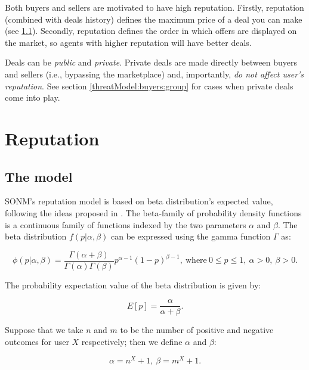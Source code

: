 \documentclass[11pt]{article}
\begin{document}
Both buyers and sellers are motivated to have high reputation. Firstly, reputation (combined with deals history) defines the maximum price of a deal you can make (see \ref{reputation:theModel}). Secondly, reputation defines the order in which offers are displayed on the market, so agents with higher reputation will have better deals.

Deals can be \textit{public} and \textit{private}. Private deals are made directly between buyers and sellers (i.e., bypassing the marketplace) and, importantly, \textit{do not affect user's reputation}. See section \ref{threatModel:buyers:group} for cases when private deals come into play.

\section{Reputation} \label{reputation}

\subsection{The model} \label{reputation:theModel}

SONM's reputation model is based on beta distribution's expected value, following the ideas proposed in \cite{josang2002beta}. The beta-family of probability density functions is a continuous family of functions indexed by the two parameters $ \alpha $ and $ \beta $. The beta distribution $ f(p | \alpha, \beta) $ can be expressed using the gamma function $ \Gamma $ as:

\begin{equation} \label{betaDistribution}
\phi(p | \alpha, \beta) = \frac{\Gamma(\alpha + \beta)}{\Gamma(\alpha) \Gamma(\beta)} p^{\alpha - 1} (1 - p)^{\beta - 1},\ \text{where}\ 0 \leq p \leq 1,\ \alpha > 0,\ \beta > 0.
\end{equation}

The probability expectation value of the beta distribution is given by:

\begin{equation}
E[p] = \frac{\alpha}{\alpha + \beta}.
\end{equation}

Suppose that we take $ n $ and $ m $ to be the number of positive and negative outcomes for user $ X $ respectively; then we define $ \alpha $ and $ \beta $:

\begin{equation}
\alpha = n^{X} + 1,\ \beta = m^{X} + 1.
\end{equation}
\end{document}
